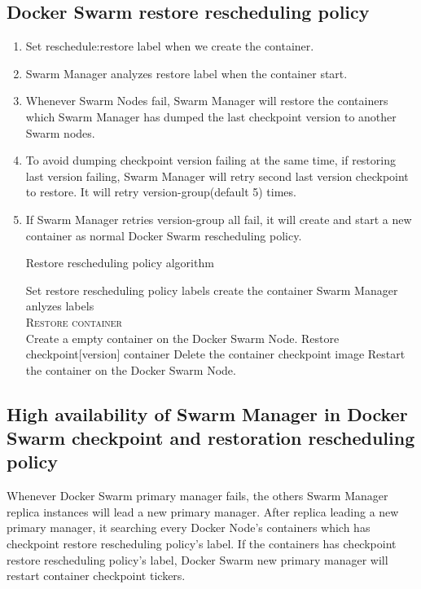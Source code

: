 \subsection{Docker Swarm restore rescheduling policy}
\begin{enumerate}[Step 1.]
    \item Set reschedule:restore label when we create the container.
    \item Swarm Manager analyzes restore label when the container start.
    \item Whenever Swarm Nodes fail, Swarm Manager will restore the containers which Swarm Manager has dumped the last checkpoint version to another Swarm nodes.
    \item To avoid dumping checkpoint version failing at the same time, if restoring last version failing, Swarm Manager will retry second last version checkpoint to restore. It will retry version-group(default 5) times.
    \item If Swarm Manager retries version-group all fail, it will create and start a new container as normal Docker Swarm rescheduling policy.
    
\begin{algorithm}[h]
    \caption{Restore rescheduling policy algorithm}
    \begin{algorithmic}[1]
        \State Set restore rescheduling policy labels create the container
        \State Swarm Manager anlyzes labels
        \\
        	\State \textsc{Restore container}
        \EndIf
        \\
        \label{code:Restore}
				\State Create a empty container on the Docker Swarm Node.
					\State Restore checkpoint[version] container
				\EndFor
				\State Delete the container checkpoint image
					\State Restart the container on the Docker Swarm Node.
				\EndIf
			\EndFor
		\EndProcedure
	\end{algorithmic}
\end{algorithm}

\end{enumerate}

\subsection{High availability of Swarm Manager in Docker Swarm checkpoint and restoration rescheduling policy}
Whenever Docker Swarm primary manager fails, the others Swarm Manager replica instances will lead a new primary manager. After replica leading a new primary manager, it searching every Docker Node's containers which has checkpoint restore rescheduling policy's label. If the containers has checkpoint restore rescheduling policy's label, Docker Swarm new primary manager will restart container checkpoint tickers.